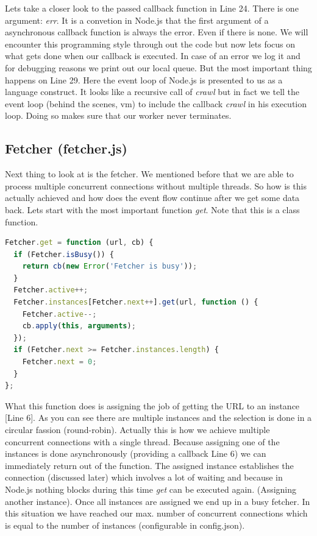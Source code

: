Lets take a closer look to the passed callback function in Line 24. There is one argument: \emph{err}. It is a convetion in Node.js that the first argument of a asynchronous callback function is always the error. Even if there is none. We will encounter this programming style through out the code but now lets focus on what gets done when our callback is executed. In case of an error we log it and for debugging reasons we print out our local queue. But the most important thing happens on Line 29. Here the event loop of Node.js is presented to us as a language construct. It looks like a recursive call of \emph{crawl} but in fact we tell the event loop (behind the scenes, vm) to include the callback \emph{crawl} in his execution loop. Doing so makes sure that our worker never terminates.

\subsection{Fetcher (fetcher.js)}
Next thing to look at is the fetcher. We mentioned before that we are able to process multiple concurrent connections without multiple threads. So how is this actually achieved and how does the event flow continue after we get some data back.
Lets start with the most important function \emph{get}. Note that this is a class function.

\begin{lstlisting}[language=JavaScript]
Fetcher.get = function (url, cb) {
  if (Fetcher.isBusy()) {
    return cb(new Error('Fetcher is busy'));
  }
  Fetcher.active++;
  Fetcher.instances[Fetcher.next++].get(url, function () {
    Fetcher.active--;
    cb.apply(this, arguments);
  });
  if (Fetcher.next >= Fetcher.instances.length) {
    Fetcher.next = 0;
  }
};
\end{lstlisting}

What this function does is assigning the job of getting the URL to an instance [Line 6]. As you can see there are multiple instances and the selection is done in a circular fassion (round-robin). Actually this is how we achieve multiple concurrent connections with a single thread. Because assigning one of the instances is done asynchronously (providing a callback Line 6) we can immediately return out of the function. The assigned instance establishes the connection (discussed later) which involves a lot of waiting and because in Node.js nothing blocks during this time \emph{get} can be executed again. (Assigning another instance). Once all instances are assigned we end up in a busy fetcher. In this situation we have reached our max. number of concurrent connections which is equal to the number of instances (configurable in config.json).

